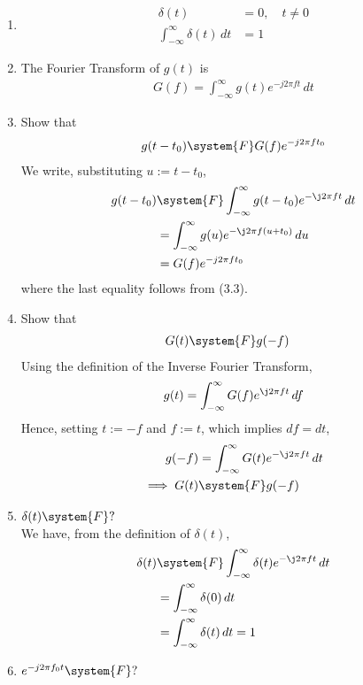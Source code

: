 \documentclass[journal,12pt,twocolumn]{IEEEtran}
\renewcommand\thesection{\arabic{section}}
\begin{document}
\begin{enumerate}[label=\thesection.\arabic*
,ref=\thesection.\theenumi]
\item 
\begin{align}
	\delta(t)&=0, \quad t\neq0
	\\
	\int_{-\infty}^{\infty}\delta(t) \, dt&= 1
\end{align}
\item The Fourier Transform of $g(t)$ is
\begin{align}
	G(f)=\int_{-\infty}^{\infty}g(t)e^{-j2\pi ft}\,dt
\end{align}
\item Show that 
\begin{align}
	g(t-t_0)&\system{F}G(f)e^{-j2\pi ft_0}\\
\end{align}
\solution We write, substituting $u := t-t_0$,
\begin{align}
	g(t-t_0)&\system{F}\int_{-\infty}^{\infty}
	g(t-t_0)e^{-\j2\pi ft}\,dt \\
	&=\int_{-\infty}^{\infty}
	g(u)e^{-\j2\pi f(u + t_0)}\,du \\
	&=G(f)e^{-j2\pi ft_0}
\end{align}
where the last equality follows from (3.3).
\item Show that 
\begin{align}
	G(t)&\system{F}g(-f)
\end{align}
\solution Using the definition of the Inverse Fourier Transform,
\begin{align}
	g(t)=\int_{-\infty}^{\infty}G(f)e^{\j2\pi ft}\,df
	\label{eq:duality}
\end{align}
Hence, setting $t := -f$ and $f := t$, which implies $df = dt$,
\begin{align}
	g(-f)&=\int_{-\infty}^{\infty}G(t)e^{-\j2\pi ft}\,dt \\
	\implies G(t)&\system{F}g(-f)
\end{align}
\item $\delta(t)\system{F}?$ \\
\solution
We have, from the definition of $\delta(t)$,
\begin{align}
	\delta(t)&\system{F}\int_{-\infty}^{\infty}\delta(t)e^{-\j2\pi ft}\, dt \\
	&=\int_{-\infty}^{\infty}\delta(0)\, dt \\
	&=\int_{-\infty}^{\infty}\delta(t)\, dt = 1
	\label{eq:fourier-delta}
\end{align}
\item $e^{-j2\pi f_0t}\system{F}?$ \\

\end{enumerate}
\end{document}
